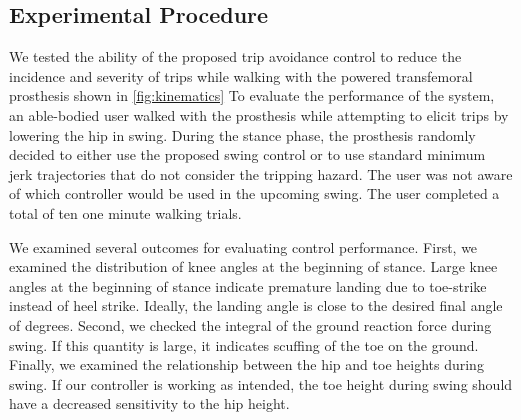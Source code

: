 \subsection{Experimental Procedure}
We tested the ability of the proposed trip avoidance control to reduce the
incidence and severity of trips while walking with the powered transfemoral
prosthesis shown in \cref{fig:kinematics} To evaluate the performance of the
system, an able-bodied user walked with the prosthesis while attempting to
elicit trips by lowering the hip in swing. During the stance phase, the
prosthesis randomly decided to either use the proposed swing control or to use
standard minimum jerk trajectories that do not consider the tripping hazard. The
user was not aware of which controller would be used in the upcoming swing.  The
user completed a total of ten one minute walking trials.

We examined several outcomes for evaluating control performance. First, we
examined the distribution of knee angles at the beginning of stance. Large knee
angles at the beginning of stance indicate premature landing due to toe-strike
instead of heel strike. Ideally, the landing angle is close to the desired final
angle of \unit[2]{degrees}. Second, we checked the integral of the ground
reaction force during swing. If this quantity is large, it indicates scuffing of
the toe on the ground. Finally, we examined the relationship between the hip and
toe heights during swing. If our controller is working as intended, the toe
height during swing should have a decreased sensitivity to the hip height.
